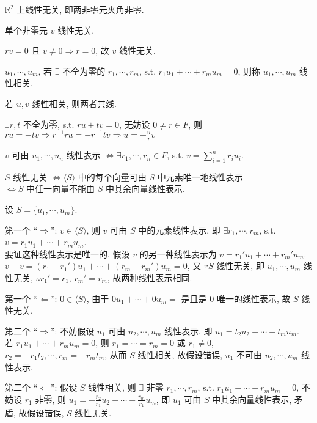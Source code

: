 \documentclass{note}
\begin{document}
\begin{eg}
    $\mathbb{R}^2$ 上线性无关, 即两非零元夹角非零.
\end{eg}

单个非零元 $v$ 线性无关.
\begin{pf}
    $rv=0$ 且 $v\neq 0\Longrightarrow r=0$, 故 $v$ 线性无关.
\end{pf}

\begin{df}[线性相关]
    $u_1,\cdots,u_m$, 若 $\exists$ 不全为零的 $r_1,\cdots,r_m$, s.t. $r_1u_1+\cdots+r_mu_m=0$, 则称 $u_1,\cdots,u_m$ 线性相关.
\end{df}

若 $u,v$ 线性相关, 则两者共线.
\begin{pf}
    $\exists r,t$ 不全为零, s.t. $ru+tv=0$, 无妨设 $0\neq r\in F$, 则 $ru=-tv\Longrightarrow r^{-1}ru=-r^{-1}tv\Longrightarrow u=-\frac{u}{r}v$
\end{pf}

\begin{df}[线性表示]
    $v$ 可由 $u_1,\cdots,u_n$ 线性表示 $\Longleftrightarrow\exists r_1,\cdots,r_n\in F$, s.t. $v=\sum_{i=1}^nr_iu_i$.
\end{df}

\begin{thm}[(课本定理 1.6)]\label{thm-1.6}
    $S$ 线性无关 $\Longleftrightarrow\langle S\rangle$ 中的每个向量可由 $S$ 中元素唯一地线性表示\\
    $\Longleftrightarrow S$ 中任一向量不能由 $S$ 中其余向量线性表示.
\end{thm}
\begin{pf}
    设 $S=\{u_1,\cdots,u_m\}$.

    第一个 ``$\Longrightarrow$'': $v\in\langle S\rangle$, 则 $v$ 可由 $S$ 中的元素线性表示, 即 $\exists r_1,\cdots,r_m$, s.t. $v=r_1u_1+\cdots+r_mu_m$.\\
    要证这种线性表示是唯一的, 假设 $v$ 的另一种线性表示为 $v=r_1'u_1+\cdots+r_m'u_m$.\\
    $v-v=(r_1-r_1')u_1+\cdots+(r_m-r_m')u_m=0$, 又 $\because S$ 线性无关, 即 $u_1,\cdots,u_m$ 线性无关, $\therefore r_1'=r_1$, $r_m'=r_m$, 故两种线性表示相同.

    第一个 ``$\Longleftarrow$'': $0\in\langle S\rangle$, 由于 $0u_1+\cdots+0u_m=$ 是且是 $0$ 唯一的线性表示, 故 $S$ 线性无关.

    第二个 ``$\Longrightarrow$'': 不妨假设 $u_1$ 可由 $u_2,\cdots,u_m$ 线性表示, 即 $u_1=t_2u_2+\cdots+t_mu_m$.\\
    若 $r_1u_1+\cdots+r_mu_m=0$, 则 $r_1=\cdots=r_m=0$ 或 $r_1\neq 0$, $r_2=-r_1t_2,\cdots,r_m=-r_mt_m$, 从而 $S$ 线性相关, 故假设错误, $u_1$ 不可由 $u_2,\cdots,u_m$ 线性表示.

    第二个 ``$\Longleftarrow$'': 假设 $S$ 线性相关, 则 $\exists$ 非零 $r_1,\cdots,r_m$, s.t. $r_1u_1+\cdots+r_mu_m=0$, 不妨设 $r_1$ 非零, 则 $u_1=-\frac{r_2}{r_1}u_2-\cdots-\frac{r_m}{r_1}u_m$, 即 $u_1$ 可由 $S$ 中其余向量线性表示, 矛盾, 故假设错误, $S$ 线性无关.
\end{pf}
\end{document}
